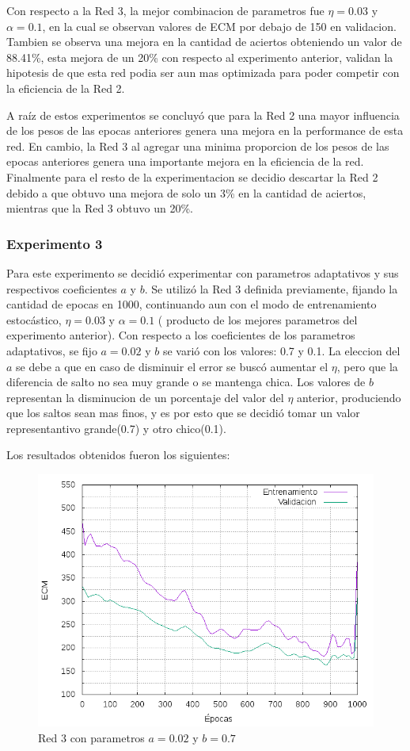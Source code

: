 Con respecto a la Red 3, la mejor combinacion de parametros fue $\eta = 0.03$ y $\alpha = 0.1$, en la cual se observan valores de ECM por debajo de 150
en validacion. Tambien se observa una mejora en la cantidad de aciertos obteniendo un valor de 88.41\%, esta mejora de un 20\% con respecto al experimento
anterior, validan la hipotesis de que esta red podia ser aun mas optimizada para poder competir con la eficiencia de la Red 2.


A raíz de estos experimentos se concluyó que para la Red 2 una mayor influencia de los pesos de las epocas anteriores genera una mejora en la performance
de esta red. En cambio, la Red 3 al agregar una minima proporcion de los pesos de las epocas anteriores genera una importante mejora en la eficiencia
de la red.
Finalmente para el resto de la experimentacion se decidio descartar la Red 2 debido a que obtuvo una mejora de solo un 3\% en la cantidad de aciertos,
mientras que la Red 3 obtuvo un 20\%.

\subsubsection{Experimento 3}
Para este experimento se decidió experimentar con parametros adaptativos y sus respectivos coeficientes $a$ y $b$. Se utilizó la Red 3 definida
previamente, fijando la cantidad de epocas en 1000, continuando aun con el modo de entrenamiento estocástico, $\eta = 0.03$ y $\alpha = 0.1$ ( producto
de los mejores parametros del experimento anterior).
Con respecto a los coeficientes de los parametros adaptativos, se fijo $a = 0.02$ y $b$ se varió con los valores: 0.7 y 0.1. La eleccion del $a$ se debe
a que en caso de disminuir el error se buscó aumentar el $\eta$, pero que la diferencia de salto no sea muy grande o se mantenga chica. Los valores de
 $b$ representan la disminucion de un porcentaje del valor del $\eta$ anterior, produciendo que los saltos sean mas finos, y es por esto que se decidió
 tomar un valor representantivo grande(0.7) y otro chico(0.1).

Los resultados obtenidos fueron los siguientes:
\begin{figure}[h!]
  \includegraphics[width=125mm]{imagenes/ej1/ex_3-1_red_11-6-6-9-1_errors.png}
  \caption{Red 3 con parametros $a = 0.02 $ y $b= 0.7$}
\end{figure}

